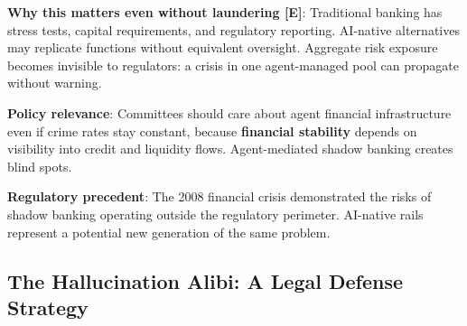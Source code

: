 \documentclass[11pt,letterpaper]{article}
\begin{document}
\textbf{Why this matters even without laundering [E]}: Traditional banking has stress tests, capital requirements, and regulatory reporting. AI-native alternatives may replicate functions without equivalent oversight. Aggregate risk exposure becomes invisible to regulators: a crisis in one agent-managed pool can propagate without warning.

\textbf{Policy relevance}: Committees should care about agent financial infrastructure even if crime rates stay constant, because \textbf{financial stability} depends on visibility into credit and liquidity flows. Agent-mediated shadow banking creates blind spots.

\textbf{Regulatory precedent}: The 2008 financial crisis demonstrated the risks of shadow banking operating outside the regulatory perimeter. AI-native rails represent a potential new generation of the same problem.

\subsection{The Hallucination Alibi: A Legal Defense Strategy}
\end{document}
